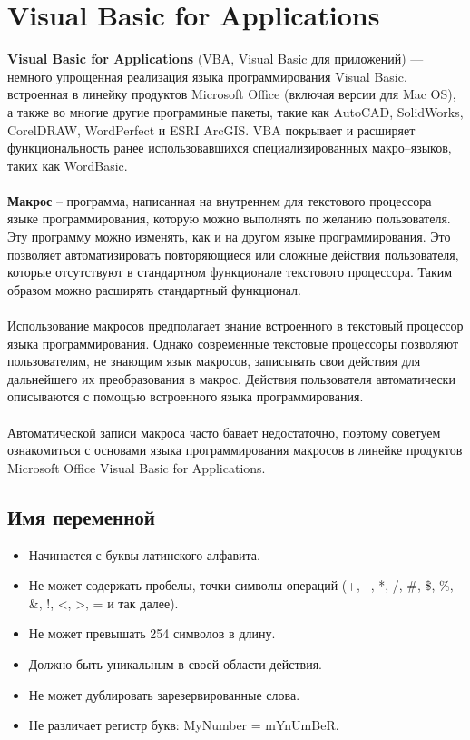 \section{Visual Basic for Applications}
\textbf{Visual Basic for Applications} (VBA, Visual Basic для приложений) — немного упрощенная реализация языка программирования Visual Basic, встроенная в линейку продуктов Microsoft Office (включая версии для Mac OS), а также во многие другие программные пакеты, такие как AutoCAD, SolidWorks, CorelDRAW, WordPerfect и ESRI ArcGIS. VBA покрывает и расширяет функциональность ранее использовавшихся специализированных макро--языков, таких как WordBasic.
\\
\\\textbf{Макрос} – программа, написанная на внутреннем для текстового процессора языке программирования, которую можно выполнять по желанию пользователя. Эту программу можно изменять, как и на другом языке программирования. Это позволяет автоматизировать повторяющиеся или сложные действия пользователя, которые отсутствуют в стандартном функционале текстового процессора. Таким образом можно расширять стандартный функционал.
\\
\\Использование макросов предполагает знание встроенного в текстовый процессор языка программирования. Однако современные текстовые процессоры позволяют пользователям, не знающим язык макросов, записывать свои действия для дальнейшего их преобразования в макрос. Действия пользователя автоматически описываются с помощью встроенного языка программирования. 
\\
\\Автоматической записи макроса часто бавает недостаточно, поэтому советуем ознакомиться с основами языка программирования макросов в линейке продуктов Microsoft Office Visual Basic for Applications.
\subsection{Имя переменной}
\begin{itemize}
  \item Начинается с буквы латинского алфавита.
  \item Не может содержать пробелы, точки символы операций (+, --, *, /, \#, \$, \%, \&, !, <, >, = и так далее).
  \item Не может превышать 254 символов в длину.
  \item Должно быть уникальным в своей области действия.
  \item Не может дублировать зарезервированные слова.
  \item Не различает регистр букв: MyNumber = mYnUmBeR.
\end{itemize}
